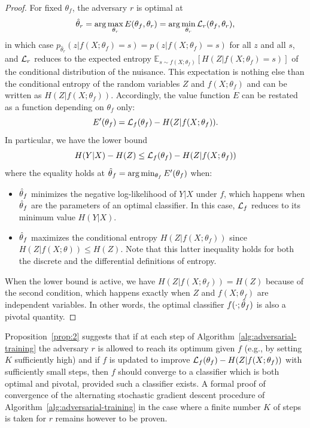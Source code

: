 \documentclass[twocolumn,superscriptaddress,aps]{revtex4-1}
\theoremstyle{plain}
\begin{document}
\begin{proof}

For fixed $\theta_f$, the adversary $r$ is optimal at $$\hat\theta_r = \arg
\max_{\theta_r} E(\theta_f, \theta_r)  = \arg \min_{\theta_r} {\cal
L}_r(\theta_f, \theta_r),$$ in which case $p_{\hat\theta_r}(z|f(X;\theta_f)=s) =
p(z|f(X;\theta_f)=s)$ for all $z$ and all $s$, and ${\cal L}_r$ reduces to the expected entropy
$\mathbb{E}_{s \sim f(X;\theta_f)} [ H({Z|f(X;\theta_f)=s}) ]$ of the conditional distribution of the nuisance.
This expectation is nothing else than the conditional entropy of the random variables
$Z$ and $f(X;\theta_f)$ and can be written as $H(Z|f(X;\theta_f))$.
Accordingly, the
value function $E$ can be restated as a function depending on $\theta_f$ only: $$E'(\theta_f) = {\cal
L}_f(\theta_f) -  H({Z|f(X;\theta_f)}).$$  In particular, we have the lower
bound $$H({Y|X}) - H(Z) \leq {\cal L}_f(\theta_f) - H({Z|f(X;\theta_f)})$$
where the equality holds at $\smash{\hat\theta}_f = \arg \min_{\theta_f}
E'(\theta_f)$  when:
\begin{itemize}
    \item $\smash{\hat\theta}_f$ minimizes the negative log-likelihood of $Y|X$ under $f$,
    which happens when $\smash{\hat\theta}_f$ are the parameters
    of an optimal classifier. In this case, ${\cal L}_f$ reduces to its
    minimum value $H({Y|X})$.

    \item $\smash{\hat\theta}_f$ maximizes the conditional entropy
    $H({Z|f(X;\theta_f)})$ since $H(Z|f(X;\theta)) \leq H(Z)$. Note that this
    latter inequality holds for both the discrete and the differential definitions of entropy.
\end{itemize}
When the lower bound is active, we have $H(Z|f(X;\theta_f)) = H(Z)$
because of the second condition, which happens exactly when $Z$ and $f(X;\theta_f)$
are independent variables. In other words,  the
optimal classifier $f(\cdot;\smash{\hat\theta}_f)$ is also a pivotal
quantity.

\end{proof}

Proposition~\ref{prop:2} suggests that if at each step of
Algorithm~\ref{alg:adversarial-training} the adversary $r$ is allowed to reach
its optimum given $f$ (e.g., by setting $K$ sufficiently high) and if $f$ is
updated to improve ${\cal L}_f(\theta_f) -  H({Z|f(X;\theta_f)})$ with
sufficiently small steps, then $f$ should converge to a classifier which is both
optimal and pivotal, provided such a classifier exists. A formal proof of
convergence of the alternating stochastic gradient descent procedure of
Algorithm~\ref{alg:adversarial-training} in the case where a finite number $K$
of steps is taken for $r$ remains however to be proven.
\end{document}
